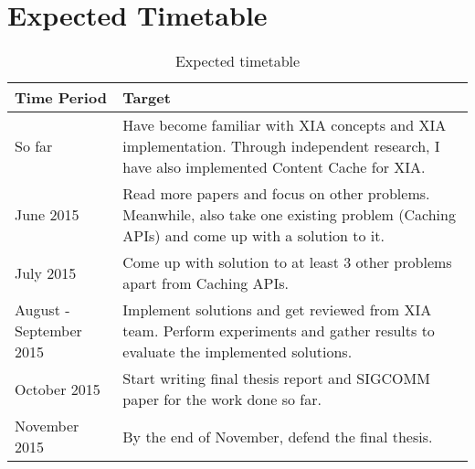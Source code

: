 \section{Expected Timetable}
\label{timetable}
\begin{table}[H]
  \begin{center}
    \begin{tabularx}{\textwidth}{p{1.2in} p{4in}}
        \textbf{Time Period} & \textbf{Target} \\
        \hline
        So far & Have become familiar with XIA concepts and XIA
        implementation. Through independent research, I have also
        implemented Content Cache for XIA.\\
        \hline
        June 2015 & Read more papers and focus on other
        problems. Meanwhile, also take one existing problem (Caching
        APIs) and come up with a solution to it.\\
        \hline
        July 2015 & Come up with solution to at least 3 other problems
        apart from Caching APIs.\\
        \hline
        August - September 2015 & Implement solutions and
        get reviewed from XIA team. Perform experiments and gather
        results to evaluate the implemented solutions.\\
        \hline
        October 2015 & Start writing final thesis report and SIGCOMM
        paper for the work done so far.\\
        \hline
        November 2015 & By the end of November, defend the final
        thesis.\\
    \end{tabularx}
    \caption{Expected timetable}
    \label{table:timetable}
  \end{center}
\end{table}
